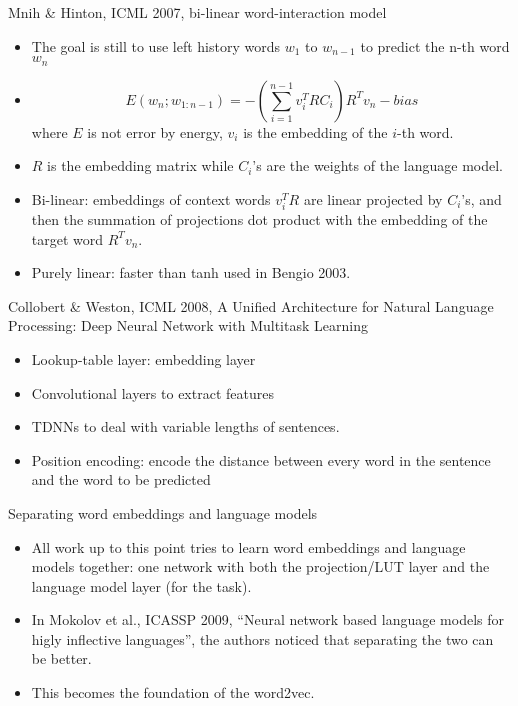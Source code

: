 \documentclass[10pt]{beamer}
\begin{document}
\begin{frame}{Mnih \& Hinton, ICML 2007, bi-linear word-interaction model}
\begin{itemize}[<+->]
  \item The goal is still to use left history words $w_1$ to $w_{n-1}$ to predict the n-th word $w_n$
  \item $$ E(w_n ; w_{1:n-1}) = - \left ( \sum_{i=1}^{n-1} v_i^T R C_i  \right ) R^T v_n - bias $$ 
  where $E$ is not error by energy, $v_i$ is the embedding of the $i$-th word. 
  \item $R$ is the embedding matrix while $C_i$'s are the weights of the language model. 
  \item Bi-linear: embeddings of context words $v_i^T R$ are linear projected by $C_i$'s, and then the summation of projections dot product with the embedding of the target word $R^Tv_n$. 
  \item Purely linear: faster than tanh used in Bengio 2003. 
\end{itemize}
\end{frame}

\begin{frame}{Collobert \& Weston, ICML 2008, A Unified Architecture for Natural Language Processing: Deep Neural Network with Multitask Learning}
\begin{itemize}[<+->]
  \item Lookup-table layer: embedding layer 
  \item Convolutional layers to extract features
  \item TDNNs to deal with variable lengths of sentences. 
  \item Position encoding: encode the distance between every word in the sentence and the word to be predicted 
\end{itemize}
\end{frame}

\begin{frame}{Separating word embeddings and language models}
\begin{itemize}[<+->]
   \item All work up to this point tries to learn word embeddings and language models together: one network with both the projection/LUT layer  and the language model layer (for the task). 
   \item In  Mokolov et al., ICASSP 2009, ``Neural network based language models for higly inflective languages'', the authors noticed that separating the two can be better. 
   \item This becomes the foundation of the word2vec. 
\end{itemize}
\end{frame}
\end{document}
